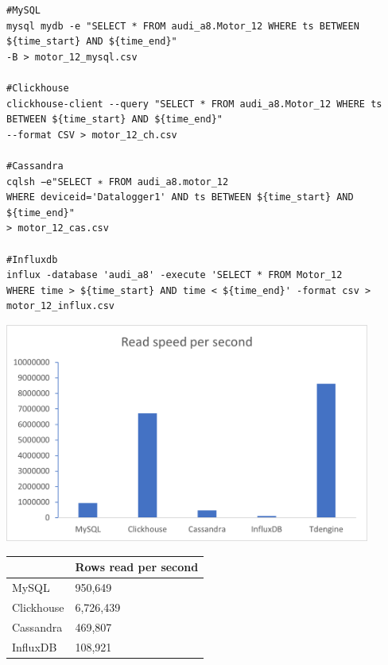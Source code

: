 \begin{verbatim}
#MySQL
mysql mydb -e "SELECT * FROM audi_a8.Motor_12 WHERE ts BETWEEN ${time_start} AND ${time_end}" 
-B > motor_12_mysql.csv

#Clickhouse 
clickhouse-client --query "SELECT * FROM audi_a8.Motor_12 WHERE ts BETWEEN ${time_start} AND ${time_end}"
--format CSV > motor_12_ch.csv

#Cassandra
cqlsh −e"SELECT ∗ FROM audi_a8.motor_12 
WHERE deviceid='Datalogger1' AND ts BETWEEN ${time_start} AND ${time_end}"
> motor_12_cas.csv

#Influxdb
influx -database 'audi_a8' -execute 'SELECT * FROM Motor_12 
WHERE time > ${time_start} AND time < ${time_end}' -format csv > motor_12_influx.csv

\end{verbatim}
  
\begin{minipage}{\textwidth}
  \begin{minipage}[b]{0.49\textwidth}
    \centering
    \includegraphics[width=0.9\textwidth]{gfx/read_performance.png}
    \label{fig:Read_performance}
  \end{minipage}
  \hfill
  \begin{minipage}[b]{0.49\textwidth}
    \centering
   \begin{tabular}{@{}ll@{}}
    \toprule
               & Rows read per second \\ \midrule
    MySQL      & 950,649               \\
    Clickhouse & 6,726,439             \\
    Cassandra  & 469,807               \\
    InfluxDB   & 108,921                \\ \bottomrule
    \end{tabular}
    \end{minipage}
  \end{minipage}
  
